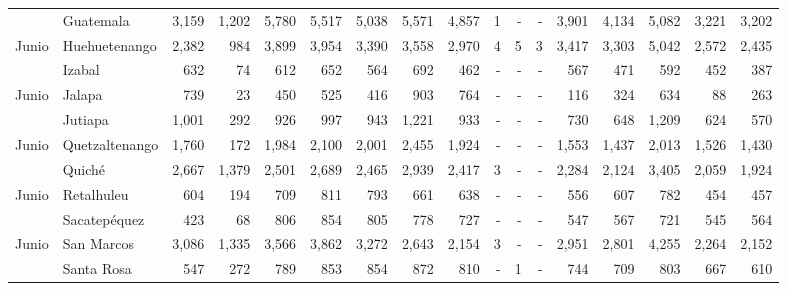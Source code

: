 \begin{landscape}
\begin{center}
\begin{longtable}{llrrrrrrrrrrrrrrr}
			\rowcolor{color1!5!white}\multicolumn{1}{l}{	\footnotesize	 Junio 	}&	 Guatemala 	&	 3,159 	&	 1,202 	&	 5,780 	&	 5,517 	&	 5,038 	&	 5,571 	&	 4,857 	&	 1 	&	 -   	&	 -   	&	 3,901 	&	 4,134 	&	 5,082 	&	 3,221 	&	 3,202 	\\
			\multicolumn{1}{l}{	\footnotesize	 Junio 	}&	 Huehuetenango 	&	 2,382 	&	 984 	&	 3,899 	&	 3,954 	&	 3,390 	&	 3,558 	&	 2,970 	&	 4 	&	 5 	&	 3 	&	 3,417 	&	 3,303 	&	 5,042 	&	 2,572 	&	 2,435 	\\
			\rowcolor{color1!5!white}\multicolumn{1}{l}{	\footnotesize	 Junio 	}&	 Izabal 	&	 632 	&	 74 	&	 612 	&	 652 	&	 564 	&	 692 	&	 462 	&	 -   	&	 -   	&	 -   	&	 567 	&	 471 	&	 592 	&	 452 	&	 387 	\\
			\multicolumn{1}{l}{	\footnotesize	 Junio 	}&	 Jalapa 	&	 739 	&	 23 	&	 450 	&	 525 	&	 416 	&	 903 	&	 764 	&	 -   	&	 -   	&	 -   	&	 116 	&	 324 	&	 634 	&	 88 	&	 263 	\\
			\rowcolor{color1!5!white}\multicolumn{1}{l}{	\footnotesize	 Junio 	}&	 Jutiapa 	&	 1,001 	&	 292 	&	 926 	&	 997 	&	 943 	&	 1,221 	&	 933 	&	 -   	&	 -   	&	 -   	&	 730 	&	 648 	&	 1,209 	&	 624 	&	 570 	\\
			\multicolumn{1}{l}{	\footnotesize	 Junio 	}&	 Quetzaltenango 	&	 1,760 	&	 172 	&	 1,984 	&	 2,100 	&	 2,001 	&	 2,455 	&	 1,924 	&	 -   	&	 -   	&	 -   	&	 1,553 	&	 1,437 	&	 2,013 	&	 1,526 	&	 1,430 	\\
			\rowcolor{color1!5!white}\multicolumn{1}{l}{	\footnotesize	 Junio 	}&	 Quiché 	&	 2,667 	&	 1,379 	&	 2,501 	&	 2,689 	&	 2,465 	&	 2,939 	&	 2,417 	&	 3 	&	 -   	&	 -   	&	 2,284 	&	 2,124 	&	 3,405 	&	 2,059 	&	 1,924 	\\
			\multicolumn{1}{l}{	\footnotesize	 Junio 	}&	 Retalhuleu 	&	 604 	&	 194 	&	 709 	&	 811 	&	 793 	&	 661 	&	 638 	&	 -   	&	 -   	&	 -   	&	 556 	&	 607 	&	 782 	&	 454 	&	 457 	\\
			\rowcolor{color1!5!white}\multicolumn{1}{l}{	\footnotesize	 Junio 	}&	 Sacatepéquez 	&	 423 	&	 68 	&	 806 	&	 854 	&	 805 	&	 778 	&	 727 	&	 -   	&	 -   	&	 -   	&	 547 	&	 567 	&	 721 	&	 545 	&	 564 	\\
			\multicolumn{1}{l}{	\footnotesize	 Junio 	}&	 San Marcos 	&	 3,086 	&	 1,335 	&	 3,566 	&	 3,862 	&	 3,272 	&	 2,643 	&	 2,154 	&	 3 	&	 -   	&	 -   	&	 2,951 	&	 2,801 	&	 4,255 	&	 2,264 	&	 2,152 	\\
			\rowcolor{color1!5!white}\multicolumn{1}{l}{	\footnotesize	 Junio 	}&	 Santa Rosa 	&	 547 	&	 272 	&	 789 	&	 853 	&	 854 	&	 872 	&	 810 	&	 -   	&	 1 	&	 -   	&	 744 	&	 709 	&	 803 	&	 667 	&	 610 	\\

\end{longtable}
\end{center}
\end{landscape}
